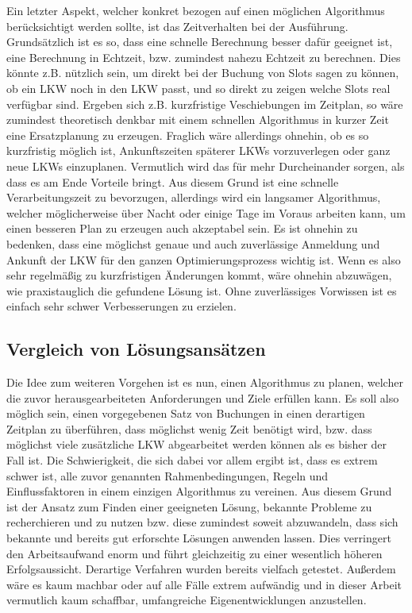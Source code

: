 Ein letzter Aspekt, welcher konkret bezogen auf einen möglichen Algorithmus berücksichtigt werden sollte, ist das Zeitverhalten bei der Ausführung. Grundsätzlich ist es so, dass eine schnelle Berechnung besser dafür geeignet ist, eine Berechnung in Echtzeit, bzw. zumindest nahezu Echtzeit zu berechnen. Dies könnte z.B. nützlich sein, um direkt bei der Buchung von Slots sagen zu können, ob ein LKW noch in den LKW passt, und so direkt zu zeigen welche Slots real verfügbar sind. Ergeben sich z.B. kurzfristige Veschiebungen im Zeitplan, so wäre zumindest theoretisch denkbar mit einem schnellen Algorithmus in kurzer Zeit eine Ersatzplanung zu erzeugen. Fraglich wäre allerdings ohnehin, ob es so kurzfristig möglich ist, Ankunftszeiten späterer LKWs vorzuverlegen oder ganz neue LKWs einzuplanen. Vermutlich wird das für mehr Durcheinander sorgen, als dass es am Ende Vorteile bringt. Aus diesem Grund ist eine schnelle Verarbeitungszeit zu bevorzugen, allerdings wird ein langsamer Algorithmus, welcher möglicherweise über Nacht oder einige Tage im Voraus arbeiten kann, um einen besseren Plan zu erzeugen auch akzeptabel sein. Es ist ohnehin zu bedenken, dass eine möglichst genaue und auch zuverlässige Anmeldung und Ankunft der LKW für den ganzen Optimierungsprozess wichtig ist. Wenn es also sehr regelmäßig zu kurzfristigen Änderungen kommt, wäre ohnehin abzuwägen, wie praxistauglich die gefundene Lösung ist. Ohne zuverlässiges Vorwissen ist es einfach sehr schwer Verbesserungen zu erzielen.


\subsection{Vergleich von Lösungsansätzen}

Die Idee zum weiteren Vorgehen ist es nun, einen Algorithmus zu planen, welcher die zuvor herausgearbeiteten Anforderungen und Ziele erfüllen kann. Es soll also möglich sein, einen vorgegebenen Satz von Buchungen in einen derartigen Zeitplan zu überführen, dass möglichst wenig Zeit benötigt wird, bzw. dass möglichst viele zusätzliche LKW abgearbeitet werden können als es bisher der Fall ist. Die Schwierigkeit, die sich dabei vor allem ergibt ist, dass es extrem schwer ist, alle zuvor genannten Rahmenbedingungen, Regeln und Einflussfaktoren in einem einzigen Algorithmus zu vereinen. Aus diesem Grund ist der Ansatz zum Finden einer geeigneten Lösung, bekannte Probleme zu recherchieren und zu nutzen bzw. diese zumindest soweit abzuwandeln, dass sich bekannte und bereits gut erforschte Lösungen anwenden lassen. Dies verringert den Arbeitsaufwand enorm und führt gleichzeitig zu einer wesentlich höheren Erfolgsaussicht. Derartige Verfahren wurden bereits vielfach getestet. Außerdem wäre es kaum machbar oder auf alle Fälle extrem aufwändig und in dieser Arbeit vermutlich kaum schaffbar, umfangreiche Eigenentwicklungen anzustellen.


